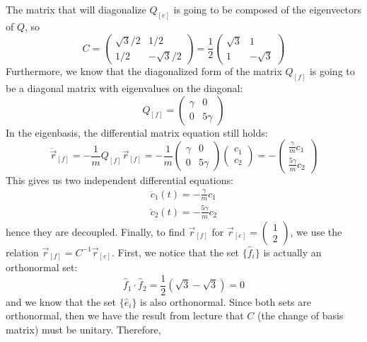 \documentclass[10pt]{article}
\begin{document}
\begin{enumerate}[label=\alph*)]
		\begin{solution}
			The matrix that will diagonalize $Q_{[e]}$ is going to be composed of the eigenvectors of $Q$, so
			\[
				C = \begin{pmatrix} \sqrt{3}/2 & 1 / 2\\ 1 / 2& -\sqrt{3} /2  \end{pmatrix} = \frac{1}{2}
				\begin{pmatrix} \sqrt{3} & 1\\ 1 & -\sqrt{3}  \end{pmatrix} 
			\] %
			Furthermore, we know that the diagonalized form of the matrix $Q_{[f]}$ is going to be a diagonal
			matrix with eigenvalues on the diagonal:
			\[
				Q_{[f]} = \begin{pmatrix}  \gamma & 0 \\ 0 & 5 \gamma  \end{pmatrix} 
			\] 
			In the eigenbasis, the differential matrix equation still holds:
			\[
				\ddot {\vec r}_{[f]} = -\frac{1}{m} Q_{[f]} \vec r_{[f]} = -\frac{1}{m}\begin{pmatrix} \gamma & 0 \\ 0 & 5 \gamma \end{pmatrix} \begin{pmatrix} c_1 \\ c_2 \end{pmatrix} = -\begin{pmatrix} \frac{\gamma}{m} c_1 \\ \frac{5\gamma}{m} c_2 \end{pmatrix} 
			\] 
			This gives us two independent differential equations:
		\begin{align*}
			\ddot c_1(t) = -\frac{\gamma}{m}c_1\\
			\ddot c_2(t) = -\frac{5\gamma}{m}c_2
		\end{align*}
		hence they are decoupled. Finally, to find $\vec r_{[f]}$ for $\vec r_{[e]} = 
		\begin{pmatrix} 1\\2 \end{pmatrix} $, we use the relation $\vec r_{[f]} = C^{-1} \vec r_{[e]}$. First, 
		we notice that the set $\{\hat{f}_i\}$ is actually an orthonormal set:
		\[
			\hat{f}_1 \cdot \hat{f}_2 = \frac{1}{2}\left( \sqrt{3} - \sqrt{3}  \right) = 0
		\] 
		and we know that the set $\{\hat{e}_i\}$ is also orthonormal. Since both sets are orthonormal, 
		then we have the result from lecture that $C$ (the change of basis matrix) must be unitary. Therefore, 

\end{solution}
\end{enumerate}
\end{document}
